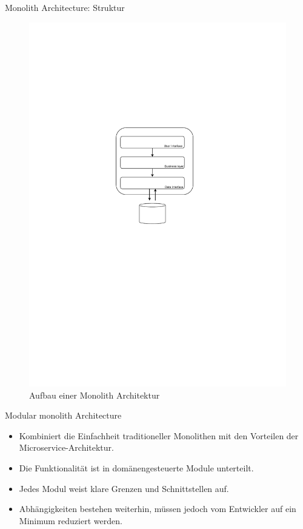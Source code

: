 \begin{frame}{Monolith Architecture: Struktur}
    \begin{figure}[!h]
        \centering
        \includegraphics[scale=0.55]{imglib/mono/mono}
        \caption{Aufbau einer Monolith Architektur}
        \label{fig:microkernel}
    \end{figure}
\end{frame}

\begin{frame}{Modular monolith Architecture}
    \begin{itemize}
       \item Kombiniert die Einfachheit traditioneller Monolithen mit den Vorteilen der Microservice-Architektur.
       \item Die Funktionalität ist in domänengesteuerte Module unterteilt.
       \item Jedes Modul weist klare Grenzen und Schnittstellen auf.
       \item Abhängigkeiten bestehen weiterhin, müssen jedoch vom Entwickler auf ein Minimum reduziert werden.
     \end{itemize}
\end{frame}


